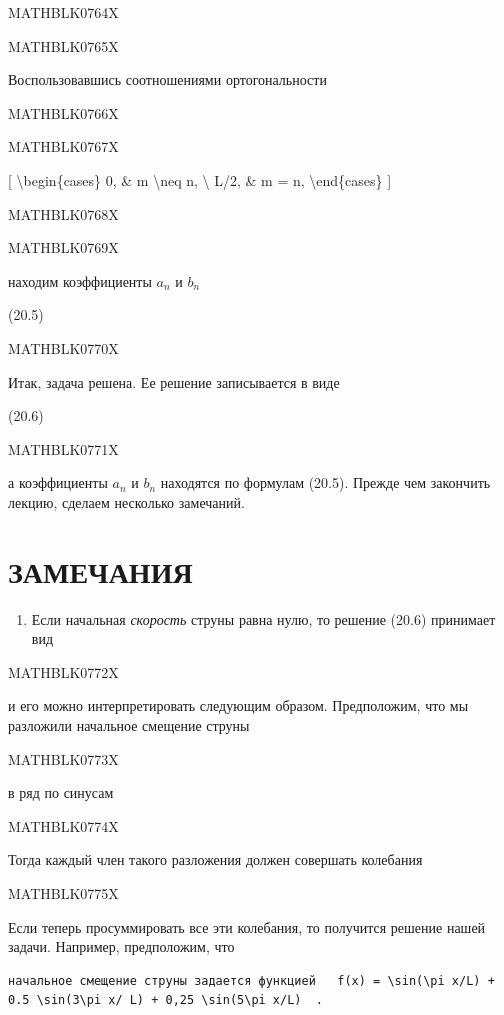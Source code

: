 \documentclass[
]{article}
\providecommand{\tightlist}{%
  \setlength{\itemsep}{0pt}\setlength{\parskip}{0pt}}
\begin{document}
MATHBLK0764X

MATHBLK0765X

Воспользовавшись соотношениями ортогональности

MATHBLK0766X

MATHBLK0767X

{[} \textbackslash begin\{cases\} 0, \& m \textbackslash neq n,
\textbackslash{} L/2, \& m = n, \textbackslash end\{cases\} {]}

MATHBLK0768X

MATHBLK0769X

находим коэффициенты \(a_n\) и \(b_n\)

(20.5)

MATHBLK0770X

Итак, задача решена. Ее решение записывается в виде

(20.6)

MATHBLK0771X

а коэффициенты \(a_n\) и \(b_n\) находятся по формулам (20.5). Прежде
чем закончить лекцию, сделаем несколько замечаний.

\section{ЗАМЕЧАНИЯ}\label{ux437ux430ux43cux435ux447ux430ux43dux438ux44f-5}

\begin{enumerate}
\def\labelenumi{\arabic{enumi}.}
\tightlist
\item
  Если начальная \emph{скорость} струны равна нулю, то решение (20.6)
  принимает вид
\end{enumerate}

MATHBLK0772X

и его можно интерпретировать следующим образом. Предположим, что мы
разложили начальное смещение струны

MATHBLK0773X

в ряд по синусам

MATHBLK0774X

Тогда каждый член такого разложения должен совершать колебания

MATHBLK0775X

Если теперь просуммировать все эти колебания, то получится решение нашей
задачи. Например, предположим, что

\begin{verbatim}
начальное смещение струны задается функцией   f(x) = \sin(\pi x/L) + 0.5 \sin(3\pi x/ L) + 0,25 \sin(5\pi x/L)  .
\end{verbatim}
\end{document}
